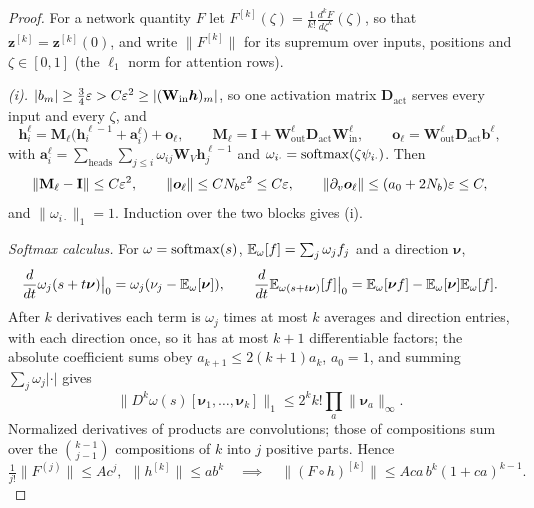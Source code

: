 \begin{proof}
For a network quantity $F$ let $F^{[k]}(\zeta)=\frac{1}{k!}\frac{d^kF}{d\zeta^k}(\zeta)$, so that $\bm z^{[k]}=\bm z^{[k]}(0)$, and write $\|F^{[k]}\|$ for its supremum over
inputs, positions and $\zeta\in[0,1]$ (the $\ell_1$ norm for attention rows).

\emph{(i).} $|b_m|\ge\frac{3}{4}\varepsilon>C\varepsilon^2\ge|(\mathbf W_{\mathrm{in}}\bm h)_m|$, so one activation matrix $\mathbf D_{\mathrm{act}}$ serves every input and every $\zeta$, and
\[
 \bm h_i^\ell=\mathbf M_\ell\bigl(\bm h_i^{\ell-1}+\bm a_i^\ell\bigr)+\bm o_\ell,\qquad \mathbf M_\ell=\mathbf I+\mathbf W^\ell_{\mathrm{out}}\mathbf D_{\mathrm{act}}\mathbf W^\ell_{\mathrm{in}},\qquad \bm o_\ell=\mathbf W^\ell_{\mathrm{out}}\mathbf D_{\mathrm{act}}\bm b^\ell,
\]
with $\bm a_i^\ell=\sum_{\mathrm{heads}}\sum_{j\le i}\omega_{ij}\mathbf W_V\bm h^{\ell-1}_j$ and $\omega_{i\cdot}=\operatorname{softmax}(\zeta\psi_{i\cdot})$. Then
\[
 \|\mathbf M_\ell-\mathbf I\|\le C\varepsilon^2,\qquad \|\bm o_\ell\|\le CN_b\varepsilon^2\le C\varepsilon,\qquad \|\partial_v\bm o_\ell\|\le(a_0+2N_b)\varepsilon\le C,
\]
and $\|\omega_{i\cdot}\|_1=1$. Induction over the two blocks gives (i).

\emph{Softmax calculus.} For $\omega=\operatorname{softmax}(s)$, $\mathbb E_\omega[f]=\sum_j\omega_jf_j$ and a direction $\bm\nu$,
\[
 \tfrac{d}{dt}\omega_j(s+t\bm\nu)\big|_0=\omega_j(\nu_j-\E_\omega[\bm\nu]),\qquad
 \tfrac{d}{dt}\E_{\omega(s+t\bm\nu)}[f]\big|_0=\E_\omega[\bm\nu f]-\E_\omega[\bm\nu]\E_\omega[f].
\]
After $k$ derivatives each term is $\omega_j$ times at most $k$ averages and direction entries, with each direction once, so it has at
most $k+1$ differentiable factors; the absolute coefficient sums obey $a_{k+1}\le2(k+1)a_k$, $a_0=1$, and summing $\sum_j\omega_j|\cdot|$ gives
\begin{equation}
 \bigl\|D^k\omega(s)[\bm\nu_1,\ldots,\bm\nu_k]\bigr\|_1\le2^kk!\prod_a\|\bm\nu_a\|_\infty .
 \label{eq:softmax-avg}
\end{equation}
Normalized derivatives of products are convolutions; those of compositions sum over the $\binom{k-1}{j-1}$ compositions of $k$ into $j$
positive parts. Hence
\[
 \tfrac{1}{j!}\|F^{(j)}\|\le Ac^j,\ \ \|h^{[k]}\|\le ab^k\quad\implies\quad\|(F\circ h)^{[k]}\|\le Aca\,b^k(1+ca)^{k-1}.
\]


\end{proof}

